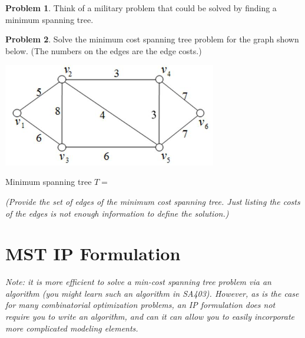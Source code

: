 \documentclass[11pt]{article}
\theoremstyle{definition}
\newtheorem{problem}{Problem}
\newcommand{\answerbox}[3]{%
  \fbox{%
    \begin{minipage}[#1]{#2}
      \hfill\vspace{#3}
    \end{minipage}
  }
}
\newcommand{\answerboxfull}[2]{%
  \answerbox{#1}{6.38in}{#2} 
}
\begin{document}
\bigskip

\begin{problem}  Think of a military problem that could be solved by finding a minimum spanning tree.
\answerboxfull{c}{2cm}
\end{problem}

\bigskip
\begin{problem}  Solve the minimum cost spanning tree problem for the graph shown below.  (The numbers on the edges are the edge costs.)

\begin{center}
\includegraphics[width = 0.7\textwidth]{weightedgraph}
\end{center}

Minimum spanning tree $T =$   

\answerboxfull{c}{2cm}

\emph{(Provide the set of edges of the minimum cost spanning tree.  Just listing the costs of the edges is not enough information to define the solution.)}
\end{problem}


\newpage
\section{MST IP Formulation}
\emph{Note: it is more efficient to solve a min-cost spanning tree problem via an algorithm (you might learn such an algorithm in SA403).  However, as is the case for many combinatorial optimization problems, an IP formulation does not require you to write an algorithm, and can it can allow you to easily incorporate more complicated modeling elements.}
\end{document}
